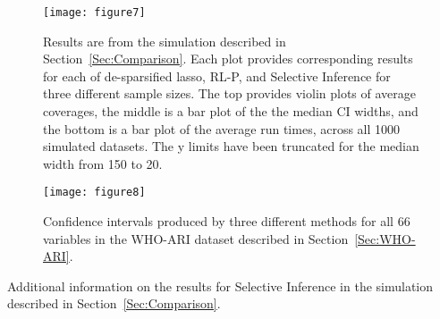 \begin{figure}[htb!]
  \begin{center}
    \texttt{[image: figure7]}
    \caption{\label{Fig:laplace_other} Results are from the simulation described in Section~\ref{Sec:Comparison}. Each plot provides corresponding results for each of de-sparsified lasso, RL-P, and Selective Inference for three different sample sizes. The top provides violin plots of average coverages, the middle is a bar plot of the the median CI widths, and the bottom is a bar plot of the average run times, across all 1000 simulated datasets. The y limits have been truncated for the median width from 150 to 20.}
  \end{center}
\end{figure}

\begin{figure}[htb!]
  \begin{center}
    \texttt{[image: figure8]}
    \caption{\label{Fig:comparison_data_whoari} Confidence intervals produced by three different methods for all 66 variables in the WHO-ARI dataset described in Section~\ref{Sec:WHO-ARI}.}
  \end{center}
\end{figure}


\begin{table}[htb!]
  \centering
  
  \caption{Additional information on the results for Selective Inference in the simulation described in Section~\ref{Sec:Comparison}.}
\end{table}

